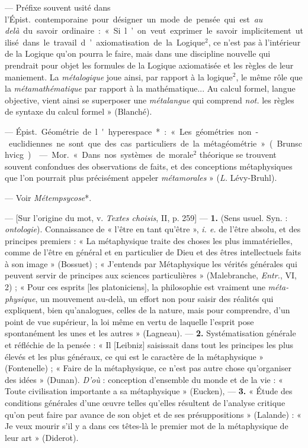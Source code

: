 \begin{itemize}[leftmargin=1cm, label=, itemsep=1pt]
 — Préfixe souvent usité dans l'\si{Épist.} contemporaine pour
désigner un mode de pensée qui est {\it au delà} du savoir ordinaire : « Si
l’on veut exprimer le savoir implicitement utilisé dans le travail
d’axiomatisation de la Logique$^2$, ce n’est pas à l’intérieur de la Logique
qu’on pourra le faire, mais dans une discipline nouvelle qui prendrait pour
objet les formules de la Logique axiomatisée et les règles de leur maniement.
La {\it métalogique} joue ainsi, par rapport à la logique$^2$, le même rôle
que la {\it métamathématique} par rapport à la mathématique... Au calcul
formel, langue objective, vient ainsi se superposer une {\it métalangue} qui
comprend {\it not.} les règles de syntaxe du calcul formel » (Blanché).

 — \si{Épist.} Géométrie de l'hyperespace* : « Les
géométries
non-euclidiennes ne sont que des cas particuliers de la
métagéométrie » (Brunschvicg).

 — \si{Mor.} « Dans nos systèmes de morale$^2$ théorique se
trouvent souvent confondues des observations de faits, et des conceptions
métaphysiques que l’on pourrait plus précisément appeler
{\it métamorales} » ({\it L.} Lévy-Bruhl).

 — Voir {\it Métempsycose}*.

 — [Sur l'origine du mot, v. {\it Textes choisis}, II,
p. 259] — {\bf 1.} (Sens usuel. Syn. : {\it ontologie}). Connaissance de
« l'être en tant qu'être », {\it i. e.} de l'être absolu, et des principes
premiers : « La métaphysique traite des choses les plus immatérielles, comme
de l'être en général et en particulier de Dieu et des êtres intellectuels
faits à son image » (Bossuet) ; « J'entends par Métaphysique les vérités
générales qui peuvent servir de principes aux sciences
particulières » (Malebranche, {\it Entr.}, VI, 2) ; « Pour ces esprits [les
platoniciens], la philosophie est vraiment une {\it méta-physique}, un
mouvement au-delà, un effort non pour saisir des réalités qui expliquent,
bien qu’analogues, celles de la nature, mais pour comprendre, d’un point de
vue supérieur, la loi même en vertu de laquelle l'esprit pose spontanément
les unes et les autres » (Lagneau). — {\bf 2.} Systématisation générale et
réfléchie de la pensée : « Il [Leibniz] saisissait dans tout les principes
les plus élevés et les plus généraux, ce qui est le caractère de la
métaphysique » (Fontenelle) ; « Faire de la métaphysique, ce n’est pas autre
chose qu'organiser des idées » (Dunan). {\it D'où} : conception d’ensemble du
monde et de la vie : « Toute civilisation importante a sa
métaphysique » (Eucken), — {\bf 3.} « Étude des conditions générales d'une
œuvre telles qu’elles résultent de l'analyse critique qu’on peut faire par
avance de son objet et de ses présuppositions » (Lalande) : « Je veux mourir
s’il y a dans ces têtes-là le premier mot de la métaphysique de leur
art » (Diderot).


\end{itemize}
